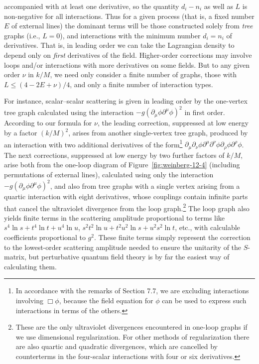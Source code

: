 accompanied with at least one derivative, so the quantity $d_i-n_i$ as well as
$L$ is non-negative for all interactions. Thus for a given process (that is,
a fixed number $E$ of external lines) the dominant terms will be those
constructed solely from \emph{tree} graphs (i.e., $L=0$), and interactions
with the minimum number $d_i=n_i$ of derivatives. That is, in leading order
we can take the Lagrangian density to depend only on \emph{first} derivatives
of the field. Higher-order corrections may involve loops and/or interactions
with more derivatives on some fields. But to any given order $\nu$ in $k/M$,
we need only consider a finite number of graphs, those with
$L\leq(4-2E+\nu)/4$, and only a finite number of interaction types.

For instance, scalar--scalar scattering is given in leading order by the
one-vertex tree graph calculated using the interaction
$-g(\partial_\mu\phi\partial^\mu\phi)^2$ in first order. According to our
formula for $\nu$, the leading correction, suppressed at low energy by a
factor $(k/M)^2$, arises from another single-vertex tree graph, produced by an
interaction with two additional derivatives of the
form\footnote{In accordance with the remarks of Section 7.7, we are excluding
interactions involving $\Box\phi$, because the field equation for $\phi$ can
be used to express such interactions in terms of the others.}
$\partial_\mu\partial_\nu\phi\partial^\mu\partial^\nu\phi
\partial_\rho\phi\partial^\rho\phi$. The next corrections, suppressed at low
energy by two further factors of $k/M$, arise both from the one-loop diagram
of Figure~\ref{fig:weinberg-12-4} (including permutations of external lines),
calculated using only the interaction
$-g(\partial_\mu\phi\partial^\mu\phi)^2$, and also from tree graphs with a
single vertex arising from a quartic interaction with eight derivatives,
whose couplings contain infinite parts that cancel the ultraviolet divergence
from the loop graph.\footnote{These are the only ultraviolet divergences
encountered in one-loop graphs if we use dimensional regularization. For
other methods of regularization there are also quartic and quadratic
divergences, which are cancelled by counterterms in the four-scalar
interactions with four or six derivatives.} The loop graph also yields finite
terms in the scattering amplitude proportional to terms like
$s^4\ln s+t^4\ln t+u^4\ln u$, $s^2t^2\ln u+t^2u^2\ln s+u^2s^2\ln t$, etc.,
with calculable coefficients proportional to $g^2$. These finite terms simply
represent the correction to the lowest-order scattering amplitude needed to
ensure the unitarity of the $S$-matrix, but perturbative quantum field theory
is by far the easiest way of calculating them.

